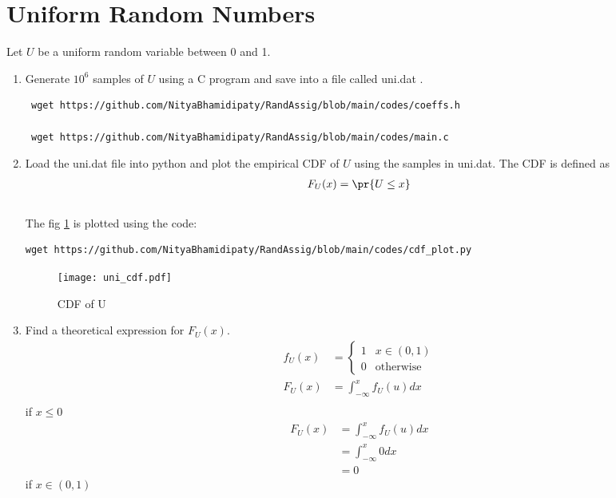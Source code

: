 \documentclass[journal,12pt,twocolumn]{IEEEtran}
\renewcommand\thesection{\arabic{section}}
\begin{document}
\section{Uniform Random Numbers}
Let $U$ be a uniform random variable between 0 and 1.
\begin{enumerate}[label=\thesection.\arabic*
,ref=\thesection.\theenumi]
\item Generate $10^6$ samples of $U$ using a C program and save into a file called uni.dat .
\\
\solution
\begin{lstlisting}
 wget https://github.com/NityaBhamidipaty/RandAssig/blob/main/codes/coeffs.h
  
 wget https://github.com/NityaBhamidipaty/RandAssig/blob/main/codes/main.c
\end{lstlisting}
\item
Load the uni.dat file into python and plot the empirical CDF of $U$ using the samples in uni.dat. The CDF is defined as
\begin{align}
F_{U}(x) = \pr{U \le x}
\end{align}
\\
\solution
The fig \ref{fig:uni_cdf} is plotted using the code:
\begin{lstlisting}
wget https://github.com/NityaBhamidipaty/RandAssig/blob/main/codes/cdf_plot.py
\end{lstlisting}
\begin{figure}[h]
    \centering
    \texttt{[image: uni\_cdf.pdf]}
    \caption{CDF of U}
    \label{fig:uni_cdf}
\end{figure}
\item
Find a  theoretical expression for $F_{U}(x)$.
\\
\solution
\begin{align}
    f_U(x) &= \begin{cases}
    1 & x\in(0,1)\\
    0 & \text{otherwise}
    \end{cases}\\
    F_U(x) &= \int_{-\infty}^{x}f_U(u)dx\\
\end{align}
if $x \le 0$
\begin{align}
    F_U(x) &= \int_{-\infty}^{x}f_U(u)dx\\
        &= \int_{-\infty}^{x}0dx\\
        &= 0
\end{align}
if $x \in (0,1)$
\begin{align}

\end{align}
\end{enumerate}
\end{document}
